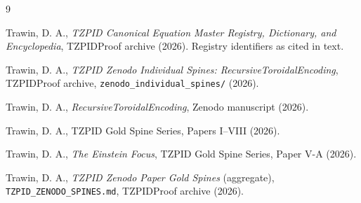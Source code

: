 \documentclass[11pt]{article}
\theoremstyle{remark}
\begin{document}
\begin{thebibliography}{9}

 Trawin, D. A., \emph{TZPID Canonical Equation Master Registry, Dictionary, and Encyclopedia}, TZPIDProof archive (2026). Registry identifiers as cited in text.

 Trawin, D. A., \emph{TZPID Zenodo Individual Spines: RecursiveToroidalEncoding}, TZPIDProof archive, \texttt{zenodo\_individual\_spines/} (2026).

 Trawin, D. A., \emph{RecursiveToroidalEncoding}, Zenodo manuscript (2026).

 Trawin, D. A., TZPID Gold Spine Series, Papers I--VIII (2026).

 Trawin, D. A., \emph{The Einstein Focus}, TZPID Gold Spine Series, Paper V-A (2026).

 Trawin, D. A., \emph{TZPID Zenodo Paper Gold Spines} (aggregate), \texttt{TZPID\_ZENODO\_SPINES.md}, TZPIDProof archive (2026).

\end{thebibliography}
\end{document}
